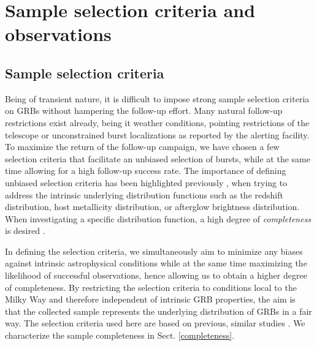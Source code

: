 \documentclass[longauth]{aa}    %
\begin{document}
\section{Sample selection criteria and observations}\label{sample}



\subsection{Sample selection criteria} \label{samplecrit}

Being of transient nature, it is difficult to impose strong sample selection
criteria on GRBs without hampering the follow-up effort. Many natural follow-up
restrictions exist already, being it weather conditions, pointing restrictions
of the telescope or unconstrained burst localizations as reported by the alerting
facility. To maximize the return of the follow-up campaign, we have chosen a
few selection criteria that facilitate an unbiased selection of bursts, while
at the same time allowing for a high follow-up success rate. The importance of
defining unbiased selection criteria has been highlighted previously
\citep{Jakobsson2006b, Salvaterra2012, Hjorth2012, Vergani2015, Perley2016a},
when trying to address the intrinsic underlying distribution functions such as
the redshift distribution, host metallicity distribution, or afterglow
brightness distribution. When investigating a specific distribution function, a
high degree of \textit{completeness} is desired \citep[e.g.,][]{Perley2016b}.

In defining the selection criteria, we simultaneously aim to minimize any biases
against intrinsic astrophysical conditions while at the same time maximizing the
likelihood of successful observations, hence allowing us to obtain a higher
degree of completeness. By restricting the selection criteria to conditions
local to the Milky Way and therefore independent of intrinsic GRB properties,
the aim is that the collected sample represents the underlying distribution of
GRBs in a fair way. The selection criteria used here are based on previous,
similar studies \citep{Jakobsson2006b, Fynbo2009, Hjorth2012}. We characterize
the sample completeness in Sect. \ref{completeness}.
\end{document}
